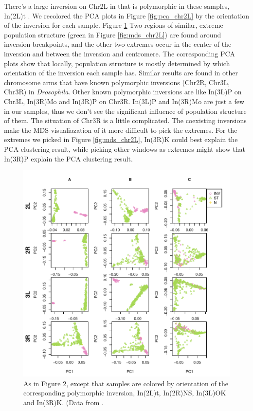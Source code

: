 \documentclass[11pt, oneside]{article}   	%
\begin{document}
There's a large inversion on Chr2L in that is polymorphic in these samples, In(2L)t \citep{corbett2012population}. We recolored the PCA plots in Figure \ref{fig:pca_chr2L} by the orientation of the inversion for each sample. Figure \ref{fig:color_inver}
Two regions of similar, extreme population structure (green in Figure \ref{fig:mds_chr2L}) are found around inversion breakpoints, 
and the other two extremes occur in the center of the inversion and between the inversion and centromere.
The corresponding PCA plots show that locally, population structure is mostly determined by which orientation of the inversion each sample has.
Similar results are found in other chromosome arms that have known polymorphic inversions (Chr2R, Chr3L, Chr3R) in \textit{Drosophila}. 
Other known polymorphic inversions are like In(3L)P on Chr3L, In(3R)Mo and  In(3R)P on Chr3R. 
In(3L)P and In(3R)Mo are just a few in our samples, thus we don't see the significant influence of population structure of them. 
The situation of Chr3R is a little complicated. The coexisting inversions make the MDS visualiazation of it more difficult to pick the extremes.
For the extremes we picked in Figure \ref{fig:mds_chr2L}, In(3R)K could best explain the PCA clustering result, 
while picking other windows as extremes might show that In(3R)P explain the PCA clustering result.

\begin{figure}
    \begin{center}
       \includegraphics{Fig3_pca_plots_color_by_inv_allchr}
    \end{center}
    \caption{
         As in Figure 2, except that samples are colored by orientation of the corresponding polymorphic inversion, In(2L)t, In(2R)NS, In(3L)OK and In(3R)K. (Data from \citet{lack2015drosophila}.
        \label{fig:color_inver}
    }
\end{figure}
\end{document}
